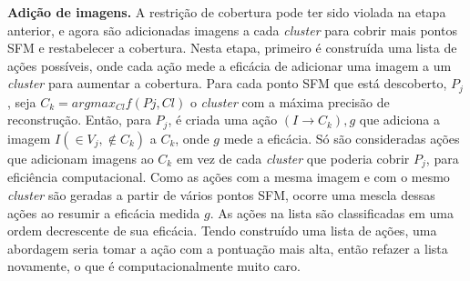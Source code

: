 \noindent\textbf{Adição de imagens.}
A restrição de cobertura pode ter sido violada na etapa anterior, e agora são
adicionadas imagens a cada \emph{cluster} para cobrir mais pontos SFM e
restabelecer a cobertura. Nesta etapa, primeiro é construída uma lista de ações
possíveis, onde cada ação mede a eficácia de adicionar uma imagem a um
\emph{cluster} para aumentar a cobertura. Para cada ponto SFM que está
descoberto, $P_j$, seja $C_k = argmax_{Cl} f(Pj, Cl)$ o \emph{cluster} com
a máxima precisão de reconstrução.  Então, para $P_j$, é criada uma ação ${(I
\rightarrow C_k), g}$ que adiciona a imagem $I (\in V_j, \not\in C_k)$ a $C_k$,
onde $g$ mede a eficácia. Só são consideradas ações que adicionam imagens ao
$C_k$ em vez de cada \emph{cluster} que poderia cobrir $P_j$, para eficiência
computacional. Como as ações com a mesma imagem e com o mesmo
\emph{cluster} são geradas a partir de vários pontos SFM, ocorre uma mescla
dessas ações ao resumir a eficácia medida $g$. As ações na lista são
classificadas em uma ordem decrescente de sua eficácia. Tendo construído uma
lista de ações, uma abordagem seria tomar a ação com a pontuação mais alta,
então refazer a lista novamente, o que é computacionalmente muito caro. 


